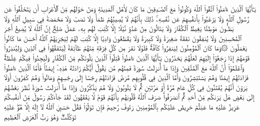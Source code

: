 يَـٰٓأَيُّهَا ٱلَّذِينَ ءَامَنُواْ ٱتَّقُواْ ٱللَّهَ وَكُونُواْ مَعَ ٱلصَّـٰدِقِينَ
مَا كَانَ لِأَهۡلِ ٱلۡمَدِينَةِ وَمَنۡ حَوۡلَهُم مِّنَ ٱلۡأَعۡرَابِ أَن يَتَخَلَّفُواْ عَن رَّسُولِ ٱللَّهِ وَلَا يَرۡغَبُواْ بِأَنفُسِهِمۡ عَن نَّفۡسِهِۦۚ ذَٰلِكَ بِأَنَّهُمۡ لَا يُصِيبُهُمۡ ظَمَأٞ وَلَا نَصَبٞ وَلَا مَخۡمَصَةٞ فِي سَبِيلِ ٱللَّهِ وَلَا يَطَـُٔونَ مَوۡطِئٗا يَغِيظُ ٱلۡكُفَّارَ وَلَا يَنَالُونَ مِنۡ عَدُوّٖ نَّيۡلًا إِلَّا كُتِبَ لَهُم بِهِۦ عَمَلٞ صَٰلِحٌۚ إِنَّ ٱللَّهَ لَا يُضِيعُ أَجۡرَ ٱلۡمُحۡسِنِينَ
وَلَا يُنفِقُونَ نَفَقَةٗ صَغِيرَةٗ وَلَا كَبِيرَةٗ وَلَا يَقۡطَعُونَ وَادِيًا إِلَّا كُتِبَ لَهُمۡ لِيَجۡزِيَهُمُ ٱللَّهُ أَحۡسَنَ مَا كَانُواْ يَعۡمَلُونَ
۞وَمَا كَانَ ٱلۡمُؤۡمِنُونَ لِيَنفِرُواْ كَآفَّةٗۚ فَلَوۡلَا نَفَرَ مِن كُلِّ فِرۡقَةٖ مِّنۡهُمۡ طَآئِفَةٞ لِّيَتَفَقَّهُواْ فِي ٱلدِّينِ وَلِيُنذِرُواْ قَوۡمَهُمۡ إِذَا رَجَعُوٓاْ إِلَيۡهِمۡ لَعَلَّهُمۡ يَحۡذَرُونَ
يَـٰٓأَيُّهَا ٱلَّذِينَ ءَامَنُواْ قَٰتِلُواْ ٱلَّذِينَ يَلُونَكُم مِّنَ ٱلۡكُفَّارِ وَلۡيَجِدُواْ فِيكُمۡ غِلۡظَةٗۚ وَٱعۡلَمُوٓاْ أَنَّ ٱللَّهَ مَعَ ٱلۡمُتَّقِينَ
وَإِذَا مَآ أُنزِلَتۡ سُورَةٞ فَمِنۡهُم مَّن يَقُولُ أَيُّكُمۡ زَادَتۡهُ هَٰذِهِۦٓ إِيمَٰنٗاۚ فَأَمَّا ٱلَّذِينَ ءَامَنُواْ فَزَادَتۡهُمۡ إِيمَٰنٗا وَهُمۡ يَسۡتَبۡشِرُونَ
وَأَمَّا ٱلَّذِينَ فِي قُلُوبِهِم مَّرَضٞ فَزَادَتۡهُمۡ رِجۡسًا إِلَىٰ رِجۡسِهِمۡ وَمَاتُواْ وَهُمۡ كَٰفِرُونَ
أَوَلَا يَرَوۡنَ أَنَّهُمۡ يُفۡتَنُونَ فِي كُلِّ عَامٖ مَّرَّةً أَوۡ مَرَّتَيۡنِ ثُمَّ لَا يَتُوبُونَ وَلَا هُمۡ يَذَّكَّرُونَ
وَإِذَا مَآ أُنزِلَتۡ سُورَةٞ نَّظَرَ بَعۡضُهُمۡ إِلَىٰ بَعۡضٍ هَلۡ يَرَىٰكُم مِّنۡ أَحَدٖ ثُمَّ ٱنصَرَفُواْۚ صَرَفَ ٱللَّهُ قُلُوبَهُم بِأَنَّهُمۡ قَوۡمٞ لَّا يَفۡقَهُونَ
لَقَدۡ جَآءَكُمۡ رَسُولٞ مِّنۡ أَنفُسِكُمۡ عَزِيزٌ عَلَيۡهِ مَا عَنِتُّمۡ حَرِيصٌ عَلَيۡكُم بِٱلۡمُؤۡمِنِينَ رَءُوفٞ رَّحِيمٞ
فَإِن تَوَلَّوۡاْ فَقُلۡ حَسۡبِيَ ٱللَّهُ لَآ إِلَٰهَ إِلَّا هُوَۖ عَلَيۡهِ تَوَكَّلۡتُۖ وَهُوَ رَبُّ ٱلۡعَرۡشِ ٱلۡعَظِيمِ